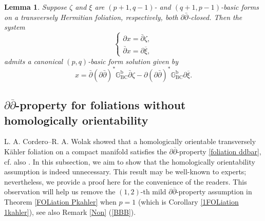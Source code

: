 \documentclass[12pt]{amsart}
\numberwithin{equation}{section}
\newtheorem{lemma}  [theorem]     {Lemma}
\theoremstyle{definition}
\theoremstyle{definition}
\theoremstyle{definition}
\renewcommand{\1}{\mathsf{1}}
\renewcommand{\>}{\rightarrow}
\newcommand{\p}{\partial}
\newcommand{\bp}{\overline\partial}
\def\p{\partial}
\theoremstyle{plain} %
\theoremstyle{plain} %
\theoremstyle{plain} %
\begin{document}
\begin{lemma}\label{ss}
Suppose $\zeta$ and $\xi$ are $(p+1,q-1)$- and $(q+1,p-1)$-basic forms on a transversely Hermitian foliation, respectively, both $\partial \bar{\partial}$-closed.
	Then the system
	\begin{equation}\label{conjugatequ-1}
		\begin{cases}
			\partial x = \bar{\partial} \zeta, \\
			\bar{\partial} x = \partial \overline{\xi},
		\end{cases}
	\end{equation}
	admits a canonical $(p,q)$-basic form solution given by
	\[
	x = \bar{\partial}(\partial \bar{\partial})^* \mathbb{G}^\mathrm{b}_{\mathrm{BC}} \bar{\partial} \zeta - \partial(\partial \bar{\partial})^* \mathbb{G}^\mathrm{b}_{\mathrm{BC}} \partial \overline{\xi}.
	\]
\end{lemma}

	\subsection{$\partial\bp$-property for foliations without homologically orientability}\label{nonHO}
	L. A. Cordero--R. A. Wolak \cite[Lemma 1 in Section 4]{CW91} showed that  a homologically orientable transversely K\"ahler foliation on a compact manifold  satisfies the $\p\bp$-property \eqref{foliation ddbar},  cf. also \cite[Theorem 7.1]{Ra17}. In this subsection, we aim to show that the homologically orientability assumption is indeed unnecessary. This result may be well-known to experts; nevertheless, we provide a proof here for the convenience of the readers.   This observation will help us  remove the $(1,2)$-th mild $\p\bp$-property assumption  in Theorem \ref{FOLiation Pkahler} when $p=1$ (which is Corollary \ref{1FOLiation 1kahler}), see also Remark \ref{Non} (\ref{BBB}).
	
	
	
	
	
\end{document}
